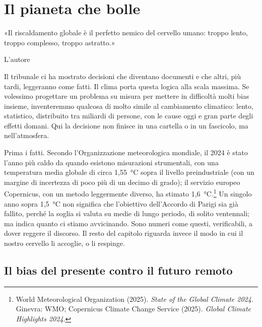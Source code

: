 \chapter{Il pianeta che bolle}
\label{cap:p2c18}

\epigraph{«Il riscaldamento globale è il perfetto nemico del cervello umano: troppo lento, troppo complesso, troppo astratto.»}{L'autore}

Il tribunale ci ha mostrato decisioni che diventano documenti e che altri, più tardi, leggeranno come fatti. Il clima porta questa logica alla scala massima. Se volessimo progettare un problema su misura per mettere in difficoltà molti bias insieme, inventeremmo qualcosa di molto simile al cambiamento climatico: lento, statistico, distribuito tra miliardi di persone, con le cause oggi e gran parte degli effetti domani. Qui la decisione non finisce in una cartella o in un fascicolo, ma nell'atmosfera.

Prima i fatti. Secondo l'Organizzazione meteorologica mondiale, il 2024 è stato l'anno più caldo da quando esistono misurazioni strumentali, con una temperatura media globale di circa 1,55~°C sopra il livello preindustriale (con un margine di incertezza di poco più di un decimo di grado); il servizio europeo Copernicus, con un metodo leggermente diverso, ha stimato 1,6~°C.\footnote{World Meteorological Organization (2025). \textit{State of the Global Climate 2024}. Ginevra: WMO; Copernicus Climate Change Service (2025). \textit{Global Climate Highlights 2024}.} Un singolo anno sopra 1,5~°C non significa che l'obiettivo dell'Accordo di Parigi sia già fallito, perché la soglia si valuta su medie di lungo periodo, di solito ventennali; ma indica quanto ci stiamo avvicinando. Sono numeri come questi, verificabili, a dover reggere il discorso. Il resto del capitolo riguarda invece il modo in cui il nostro cervello li accoglie, o li respinge.

\section{Il bias del presente contro il futuro remoto}

